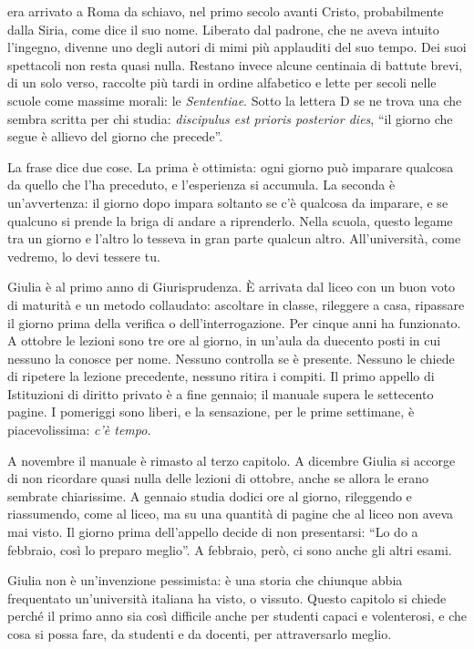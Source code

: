 
 era arrivato a Roma da schiavo, nel primo
secolo avanti Cristo, probabilmente dalla Siria, come dice il suo
nome. Liberato dal padrone, che ne aveva intuito l'ingegno, divenne uno
degli autori di mimi più applauditi del suo tempo. Dei suoi spettacoli
non resta quasi nulla. Restano invece alcune centinaia di battute
brevi, di un solo verso, raccolte più tardi in ordine alfabetico e
lette per secoli nelle scuole come massime morali: le
\emph{Sententiae}. Sotto la lettera D se ne trova una che sembra
scritta per chi studia: \emph{discipulus est prioris posterior dies},
\enquote{il giorno che segue è allievo del giorno che precede}.

La frase dice due cose. La prima è ottimista: ogni giorno può imparare
qualcosa da quello che l'ha preceduto, e l'esperienza si accumula. La
seconda è un'avvertenza: il giorno dopo impara soltanto se c'è
qualcosa da imparare, e se qualcuno si prende la briga di andare a
riprenderlo. Nella scuola, questo legame tra un giorno e l'altro lo
tesseva in gran parte qualcun altro. All'università, come vedremo, lo
devi tessere tu.

Giulia è al primo anno di Giurisprudenza. È arrivata dal liceo con un
buon voto di maturità e un metodo collaudato: ascoltare in classe,
rileggere a casa, ripassare il giorno prima della verifica o
dell'interrogazione. Per cinque anni ha funzionato. A ottobre le
lezioni sono tre ore al giorno, in un'aula da duecento posti in cui
nessuno la conosce per nome. Nessuno controlla se è presente. Nessuno
le chiede di ripetere la lezione precedente, nessuno ritira i compiti.
Il primo appello di Istituzioni di diritto privato è a fine gennaio; il
manuale supera le settecento pagine. I pomeriggi sono liberi, e la
sensazione, per le prime settimane, è piacevolissima: \emph{c'è
tempo}.

A novembre il manuale è rimasto al terzo capitolo. A dicembre Giulia si
accorge di non ricordare quasi nulla delle lezioni di ottobre, anche se
allora le erano sembrate chiarissime. A gennaio studia dodici ore al
giorno, rileggendo e riassumendo, come al liceo, ma su una quantità di
pagine che al liceo non aveva mai visto. Il giorno prima dell'appello
decide di non presentarsi: \enquote{Lo do a febbraio, così lo preparo
meglio}. A febbraio, però, ci sono anche gli altri esami.

Giulia non è un'invenzione pessimista: è una storia che chiunque abbia
frequentato un'università italiana ha visto, o vissuto. Questo
capitolo si chiede perché il primo anno sia così difficile anche per
studenti capaci e volenterosi, e che cosa si possa fare, da studenti e
da docenti, per attraversarlo meglio.


